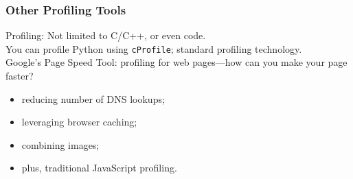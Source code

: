 \begin{frame}[fragile]
  \frametitle{Other Profiling Tools}

  
    Profiling: Not limited to C/C++, or even code.\\[1em]

    You can profile Python using {\tt cProfile}; standard profiling technology.\\[1em]

    Google's Page Speed Tool: profiling for web pages---how can you make your page faster?\\
\begin{itemize}
\item reducing number of DNS lookups;
\item leveraging browser caching;
\item combining images;
\item plus, traditional JavaScript profiling.
\end{itemize}
  
\end{frame}




